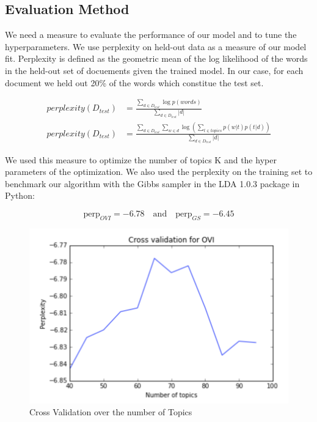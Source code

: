 \documentclass[twoside]{article}
\begin{document}
\begin{multicols}{2}
\subsection{Evaluation Method}

We need a measure to evaluate the performance of our model and to tune the hyperparameters. We use perplexity on held-out data as a measure of our model fit. Perplexity is defined as the geometric mean of the log likelihood of the words in the held-out set of docuements given the trained model. In our case, for each document we held out 20\% of the words which constitue the test set.

\begin{align*}
	perplexity(D_{test}) & = \frac{\sum\limits_{d \in D_{test}} \log p(words)}{\sum\limits_{d \in D_{test}}|d|}\\
	perplexity(D_{test}) & = \frac{\sum\limits_{d \in D_{test}} \sum\limits_{w \in d} \log \left( \sum_{t \in topics} p(w|t)p(t|d) \right)}{\sum\limits_{d \in D_{test}}|d|}
\end{align*}

\noindent We used this measure to optimize the number of topics K and the hyper parameters of the optimization. We also used the perplexity on the training set to benchmark our algorithm with the Gibbs sampler in the LDA 1.0.3 package in Python:

$$\text{perp}_{OVI} = -6.78 \quad \text{and} \quad \text{perp}_{GS} = -6.45$$

\begin{figure}[H]
\centering
\includegraphics[width=1\linewidth]{img/V.png}
\caption{Cross Validation over the number of Topics}
\end{figure}


\end{multicols}
\end{document}
